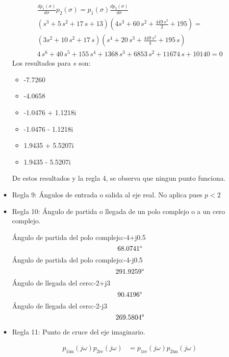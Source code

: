 \begin{itemize}
  \begin{align*}
    \frac{dp_1(\sigma)}{d\sigma} p_2(\sigma) = p_1(\sigma) \frac{dp_2(\sigma)}{d\sigma}
    \\
    (s^3+5\,s^2+17\,s+13)(4s^3+60\,s^2+\frac{449\,s^2}{2}+195) =\\ (3s^2+10\,s^2+17\,s)(s^4+20\,s^3+\frac{449\,s^2}{4}+195\,s)
    \\
    4\,s^6+40\,s^5+155\,s^4+1368\,s^3+6853\,s^2+11674\,s+10140 = 0
  \end{align*}
  Los resultados para $s$ son:
  \begin{itemize}
    \item -7.7260
    \item -4.0658
    \item -1.0476 + 1.1218i
    \item -1.0476 - 1.1218i
    \item 1.9435 + 5.5207i
    \item 1.9435 - 5.5207i
  \end{itemize}
  De estos resultados y la regla 4, se observa que ningun punto funciona.
  \item Regla 9: Ángulos de entrada o salida al eje real. No aplica pues $p<2$
  \item Regla 10: Ángulo de partida o llegada de un polo complejo o a un cero complejo.
  
  Ángulo de partida del polo complejo:-4+j0.5
  \begin{equation*}
  68.0741\degree
  \end{equation*}
Ángulo de partida del polo complejo:-4-j0.5
\begin{equation*}
  291.9259\degree
  \end{equation*}
Ángulo de llegada del cero:-2+j3
  \begin{equation*}
  90.4196\degree
  \end{equation*}
Ángulo de llegada del cero:-2-j3
  \begin{equation*}
  269.5804\degree
  \end{equation*}

  \item Regla 11: Punto de cruce del eje imaginario.

  \begin{align*}
    p_{1\text{im}}(j\omega) p_{2\text{re}}(j\omega) &=  p_{1\text{re}}(j\omega) p_{2\text{im}}(j\omega)
  \end{align*}


\end{itemize}
